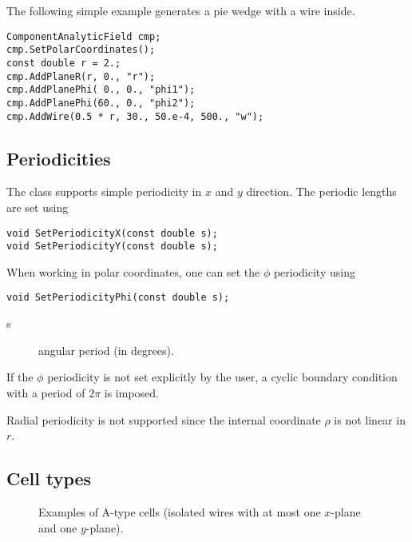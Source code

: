 The following simple example generates a pie wedge with a wire inside.
\begin{lstlisting}
ComponentAnalyticField cmp;
cmp.SetPolarCoordinates();
const double r = 2.;
cmp.AddPlaneR(r, 0., "r");
cmp.AddPlanePhi( 0., 0., "phi1");
cmp.AddPlanePhi(60., 0., "phi2");
cmp.AddWire(0.5 * r, 30., 50.e-4, 500., "w");
\end{lstlisting}

\subsection{Periodicities}
The class supports simple periodicity in \(x\) and \(y\) direction.
The periodic lengths are set using
\begin{lstlisting}
void SetPeriodicityX(const double s);
void SetPeriodicityY(const double s);
\end{lstlisting}

When working in polar coordinates, one can set the $\phi$ periodicity 
using
\begin{lstlisting}
void SetPeriodicityPhi(const double s);
\end{lstlisting} 
\begin{description}
  \item[s] angular period (in degrees).
\end{description}
If the $\phi$ periodicity is not set explicitly by the user, 
a cyclic boundary condition with a period of $2\pi$ is imposed.

Radial periodicity is not supported since the internal coordinate 
$\rho$ is not linear in $r$.

\subsection{Cell types}

\begin{figure}
  \centering
  \caption{Examples of A-type cells (isolated wires with at most one $x$-plane and one $y$-plane).}
  \label{Fig:CellTypeA}
\end{figure}

